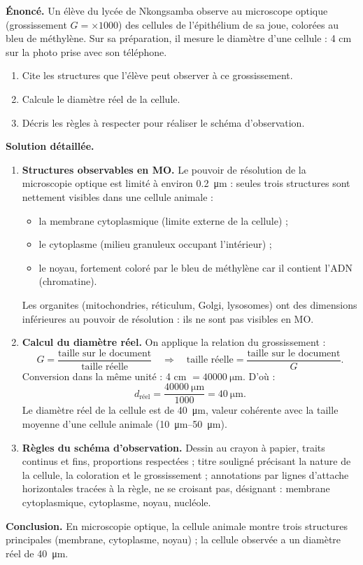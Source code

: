 \documentclass[11pt]{article}
\newcommand{\cle}[1]{{\popxbold\color{popdark}#1}}
\begin{document}
\begin{exoresolu}
\textbf{Énoncé.} Un élève du lycée de Nkongsamba observe au microscope optique (grossissement $G = \times 1000$) des cellules de l'épithélium de sa joue, colorées au bleu de méthylène. Sur sa préparation, il mesure le diamètre d'une cellule : 4 cm sur la photo prise avec son téléphone.
\begin{enumerate}
\item Cite les structures que l'élève peut observer à ce grossissement.
\item Calcule le diamètre réel de la cellule.
\item Décris les règles à respecter pour réaliser le schéma d'observation.
\end{enumerate}
\tcblower
\textbf{Solution détaillée.}
\begin{enumerate}
\item \textbf{Structures observables en MO.} Le pouvoir de résolution de la microscopie optique est limité à environ \SI{0,2}{\micro\metre} : seules trois structures sont nettement visibles dans une cellule animale :
\begin{itemize}
\item la \cle{membrane cytoplasmique} (limite externe de la cellule) ;
\item le \cle{cytoplasme} (milieu granuleux occupant l'intérieur) ;
\item le \cle{noyau}, fortement coloré par le bleu de méthylène car il contient l'ADN (chromatine).
\end{itemize}
Les organites (mitochondries, réticulum, Golgi, lysosomes) ont des dimensions inférieures au pouvoir de résolution : ils ne sont pas visibles en MO.

\item \textbf{Calcul du diamètre réel.} On applique la relation du grossissement :
\[ G = \frac{\text{taille sur le document}}{\text{taille réelle}} \quad\Longrightarrow\quad \text{taille réelle} = \frac{\text{taille sur le document}}{G}. \]
Conversion dans la même unité : 4 cm $= \SI{40000}{\micro\metre}$. D'où :
\[ d_{\text{réel}} = \frac{\SI{40000}{\micro\metre}}{1000} = \SI{40}{\micro\metre}. \]
Le diamètre réel de la cellule est de \SI{40}{\micro\metre}, valeur cohérente avec la taille moyenne d'une cellule animale (\SIrange{10}{50}{\micro\metre}).

\item \textbf{Règles du schéma d'observation.} Dessin au crayon à papier, traits continus et fins, proportions respectées ; titre souligné précisant la nature de la cellule, la coloration et le grossissement ; annotations par lignes d'attache horizontales tracées à la règle, ne se croisant pas, désignant : membrane cytoplasmique, cytoplasme, noyau, nucléole.
\end{enumerate}
\textbf{Conclusion.} En microscopie optique, la cellule animale montre trois structures principales (membrane, cytoplasme, noyau) ; la cellule observée a un diamètre réel de \SI{40}{\micro\metre}.
\end{exoresolu}
\end{document}
